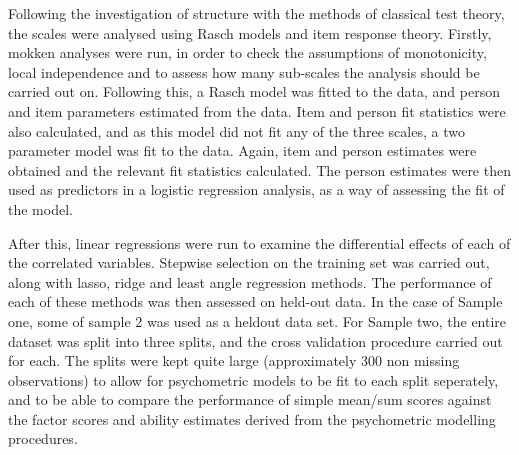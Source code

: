 Following the investigation of structure with the methods of classical test theory, the scales were analysed using Rasch models and item response theory. Firstly, mokken analyses were run, in order to check the assumptions of monotonicity, local independence and to assess how many sub-scales the analysis should be carried out on. Following this, a Rasch model was fitted to the data, and person and item parameters estimated from the data. Item and person fit statistics were also calculated, and as this model did not fit any of the three scales, a two parameter model was fit to the data. Again, item and person estimates were obtained and the relevant fit statistics calculated. The person estimates were then used as predictors in a logistic regression analysis, as a way of assessing the fit of the model.


After this, linear regressions were run to examine the differential effects of each of the correlated variables. Stepwise selection on the training set was carried out, along with lasso, ridge and least angle regression methods. The performance of each of these methods was then assessed on held-out data. In the case of Sample one, some of sample 2 was used as a heldout data set. For Sample two, the entire dataset was split into three splits, and the cross validation procedure carried out for each. The splits were kept quite large (approximately 300 non missing observations) to allow for psychometric models to be fit to each split seperately, and to be able to compare the performance of simple mean/sum scores against the factor scores and ability estimates derived from the psychometric modelling procedures.


